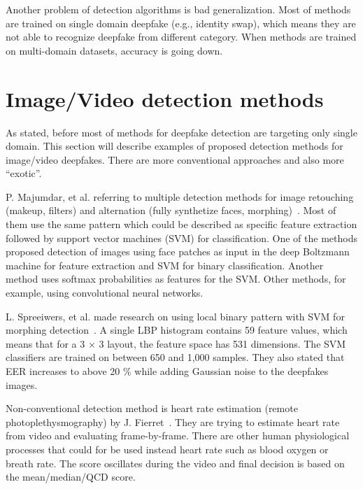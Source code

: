 Another problem of detection algorithms is bad generalization. Most of methods are trained on single domain deepfake (e.g., identity swap), which means they are not able to recognize deepfake from different category. When methods are trained on multi-domain datasets, accuracy is going down.~\cite{FacialRetouchingAndAlterationDetection}

\section{Image/Video detection methods}

As stated, before most of methods for deepfake detection are targeting only single domain. This section will describe examples of proposed detection methods for image/video deepfakes. There are more conventional approaches and also more “exotic”.

P. Majumdar, et al. referring to multiple detection methods for image retouching (makeup, filters) and alternation (fully synthetize faces, morphing)~\cite{FacialRetouchingAndAlterationDetection}. Most of them use the same pattern which could be described as specific feature extraction followed by support vector machines (SVM) for classification. One of the methods proposed detection of images using face patches as input in the deep Boltzmann machine for feature extraction and SVM for binary classification. Another method uses softmax probabilities as features for the SVM. Other methods, for example, using convolutional neural networks.~\cite{FacialRetouchingAndAlterationDetection}

L. Spreeiwers, et al. made research on using local binary pattern with SVM for morphing detection~\cite{PracticalEvaluationOfFaceMorphingAttackDetectionMethods}. A single LBP histogram contains 59 feature values, which means that for a 3 × 3 layout, the feature space has 531 dimensions. The SVM classifiers are trained on between 650 and 1,000 samples. They also stated that EER increases to above 20 \% while adding Gaussian noise to the deepfakes images.

Non-conventional detection method is heart rate estimation (remote photoplethysmography) by J. Fierret~\cite{DetectionBasedOnHeartRateEstimation}. They are trying to estimate heart rate from video and evaluating frame-by-frame. There are other human physiological processes that could for be used instead heart rate such as blood oxygen or breath rate. The score oscillates during the video and final decision is based on the mean/median/QCD score.

